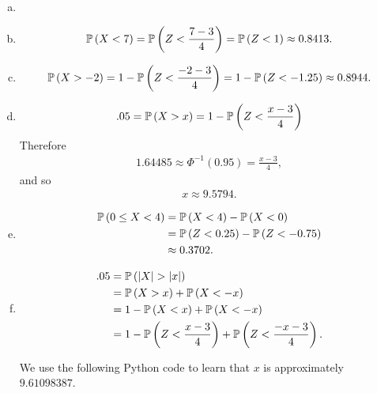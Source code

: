 \begin{ex}
  \begin{enumerate}[(a)]
    \item[]
    \item
          \begin{align*}
            \P{X<7}
            =\P{Z<\frac{7 - 3}{4}}
            =\P{Z<1}
            \approx 0.8413.
          \end{align*}
    \item
          \begin{align*}
            \P{X>-2}
            =1-\P{Z<\frac{-2 - 3}{4}}
            =1 - \P{Z<-1.25}
            \approx 0.8944.
          \end{align*}
    \item
          \begin{align*}
            .05
            =\P{X>x}
            =1-\P{Z<\frac{x-3}{4}}
          \end{align*}
          Therefore
          \begin{align*}
            1.64485\approx \Phi^{-1}(0.95)=\frac{x-3}{4},
          \end{align*}
          and so
          \begin{align*}
            x\approx 9.5794.
          \end{align*}

    \item
          \begin{align*}
            \P{0\leq X < 4}
             & =\P{X<4}-\P{X < 0}          \\
             & =\P{Z < 0.25}-\P{Z < -0.75} \\
             & \approx 0.3702.
          \end{align*}
    \item
          \begin{align*}
            .05
             & =\P{|X|>|x|}                                 \\
             & =\P{X>x}+\P{X<-x}                            \\
             & =1-\P{X<x}+\P{X<-x}                          \\
             & =1-\P{Z<\frac{x-3}{4}}+\P{Z<\frac{-x-3}{4}}.
          \end{align*}

          We use the following Python code to learn that $x$ is
          approximately $9.61098387$.

          \inputminted{python}{src/02-18.py}
  \end{enumerate}
\end{ex}

